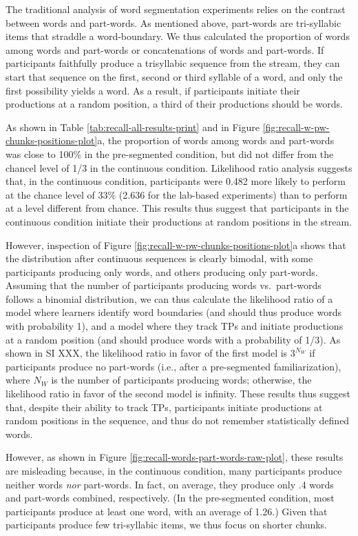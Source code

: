 \documentclass[
]{article}
\begin{document}
The traditional analysis of word segmentation experiments relies on the
contrast between words and part-words. As mentioned above, part-words
are tri-syllabic items that straddle a word-boundary. We thus calculated
the proportion of words among words and part-words or concatenations of
words and part-words. If participants faithfully produce a trisyllabic
sequence from the stream, they can start that sequence on the first,
second or third syllable of a word, and only the first possibility
yields a word. As a result, if participants initiate their productions
at a random position, a third of their productions should be words.

As shown in Table \ref{tab:recall-all-results-print} and in Figure
\ref{fig:recall-w-pw-chunks-positions-plot}a, the proportion of words
among words and part-words was close to 100\% in the pre-segmented
condition, but did not differ from the chancel level of 1/3 in the
continuous condition. Likelihood ratio analysis suggests that, in the
continuous condition, participants were 0.482 more likely to perform at
the chance level of 33\% (2.636 for the lab-based experiments) than to
perform at a level different from chance. This results thus suggest that
participants in the continuous condition initiate their productions at
random positions in the stream.

However, inspection of Figure
\ref{fig:recall-w-pw-chunks-positions-plot}a shows that the distribution
after continuous sequences is clearly bimodal, with some participants
producing only words, and others producing only part-words. Assuming
that the number of participants producing words vs.~part-words follows a
binomial distribution, we can thus calculate the likelihood ratio of a
model where learners identify word boundaries (and should thus produce
words with probability 1), and a model where they track TPs and initiate
productions at a random position (and should produce words with a
probability of 1/3). As shown in SI XXX, the likelihood ratio in favor
of the first model is \(3^{N_W}\) if participants produce no part-words
(i.e., after a pre-segmented familiarization), where \(N_W\) is the
number of participants producing words; otherwise, the likelihood ratio
in favor of the second model is infinity. These results thus suggest
that, despite their ability to track TPs, participants initiate
productions at random positions in the sequence, and thus do not
remember statistically defined words.

However, as shown in Figure \ref{fig:recall-words-part-words-raw-plot},
these results are misleading because, in the continuous condition, many
participants produce neither words \emph{nor} part-words. In fact, on
average, they produce only .4 words and part-words combined,
respectively. (In the pre-segmented condition, most participants produce
at least one word, with an average of 1.26.) Given that participants
produce few tri-syllabic items, we thus focus on shorter chunks.
\end{document}
